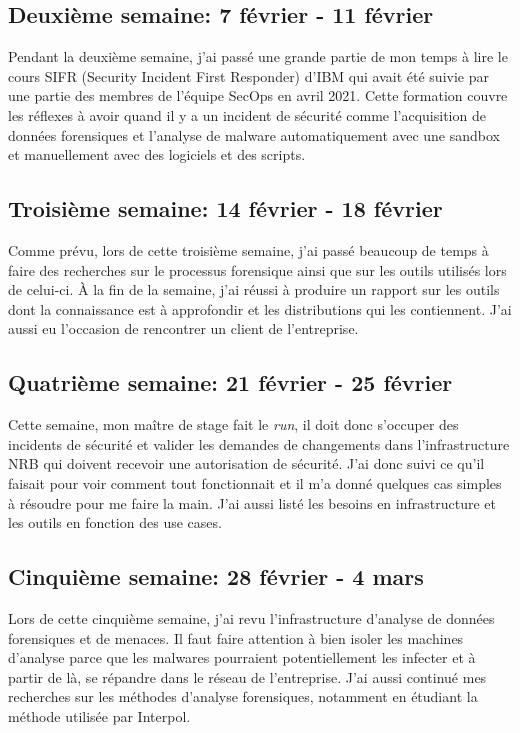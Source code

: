 \subsection{Deuxième semaine: 7 février - 11 février}

Pendant la deuxième semaine, j'ai passé une grande partie de mon temps à lire le cours SIFR (Security Incident First Responder) d'IBM qui avait été suivie par une partie des membres de l'équipe SecOps en avril 2021. Cette formation couvre les réflexes à avoir quand il y a un incident de sécurité comme l'acquisition de données forensiques et l'analyse de malware automatiquement avec une sandbox et manuellement avec des logiciels et des scripts.



\subsection{Troisième semaine: 14 février - 18 février}

Comme prévu, lors de cette troisième semaine, j'ai passé beaucoup de temps à faire des recherches sur le processus forensique ainsi que sur les outils utilisés lors de celui-ci. À la fin de la semaine, j'ai réussi à produire un rapport sur les outils dont la connaissance est à approfondir et les distributions qui les contiennent. J'ai aussi eu l'occasion de rencontrer un client de l'entreprise.



\subsection{Quatrième semaine: 21 février - 25 février}

Cette semaine, mon maître de stage fait le \textit{run}, il doit donc s'occuper des incidents de sécurité et valider les demandes de changements dans l'infrastructure NRB qui doivent recevoir une autorisation de sécurité. J'ai donc suivi ce qu'il faisait pour voir comment tout fonctionnait et il m'a donné quelques cas simples à résoudre pour me faire la main. J'ai aussi listé les besoins en infrastructure et les outils en fonction des use cases.



\subsection{Cinquième semaine: 28 février - 4 mars}

Lors de cette cinquième semaine, j'ai revu l'infrastructure d'analyse de données forensiques et de menaces. Il faut faire attention à bien isoler les machines d'analyse parce que les malwares pourraient potentiellement les infecter et à partir de là, se répandre dans le réseau de l'entreprise. J'ai aussi continué mes recherches sur les méthodes d'analyse forensiques, notamment en étudiant la méthode utilisée par Interpol.



